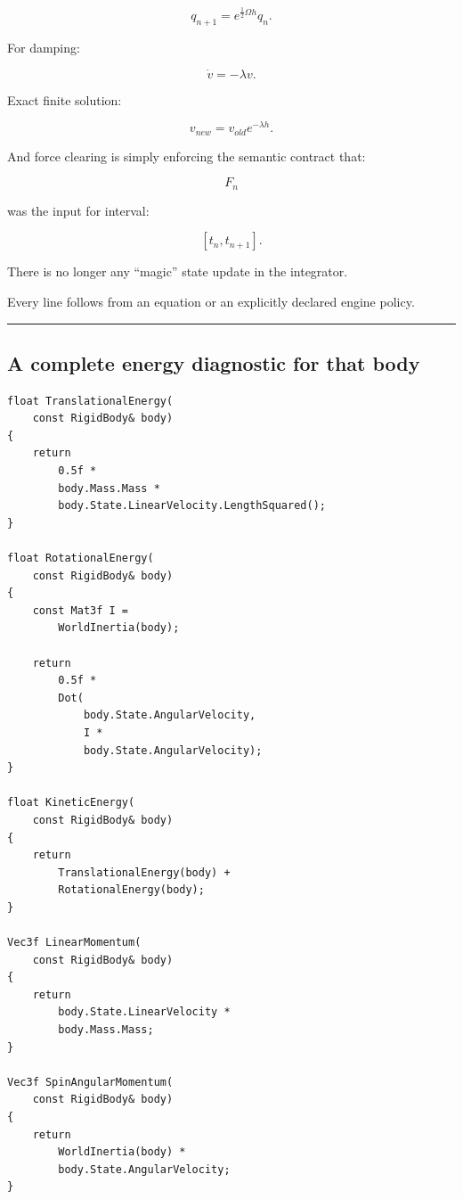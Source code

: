 \[
\boxed{
q_{n+1}
=
e^{\frac12\Omega h}
q_n.
}
\]

For damping:

\[
\dot v=-\lambda v.
\]

Exact finite solution:

\[
\boxed{
v_{new}
=
v_{old}e^{-\lambda h}.
}
\]

And force clearing is simply enforcing the semantic contract that:

\[
F_n
\]

was the input for interval:

\[
[t_n,t_{n+1}].
\]

There is no longer any ``magic'' state update in the integrator.

Every line follows from an equation or an explicitly declared engine policy.

\begin{center}\rule{0.5\linewidth}{0.5pt}\end{center}

\subsection{A complete energy diagnostic for that body}\label{06-engine-ii-ch039-a-complete-energy-diagnostic-for-that-body}

\hypertarget{06-engine-ii-ch039-a-complete-energy-diagnostic-for-that-body}{}

\begin{verbatim}
float TranslationalEnergy(
    const RigidBody& body)
{
    return
        0.5f *
        body.Mass.Mass *
        body.State.LinearVelocity.LengthSquared();
}

float RotationalEnergy(
    const RigidBody& body)
{
    const Mat3f I =
        WorldInertia(body);

    return
        0.5f *
        Dot(
            body.State.AngularVelocity,
            I *
            body.State.AngularVelocity);
}

float KineticEnergy(
    const RigidBody& body)
{
    return
        TranslationalEnergy(body) +
        RotationalEnergy(body);
}

Vec3f LinearMomentum(
    const RigidBody& body)
{
    return
        body.State.LinearVelocity *
        body.Mass.Mass;
}

Vec3f SpinAngularMomentum(
    const RigidBody& body)
{
    return
        WorldInertia(body) *
        body.State.AngularVelocity;
}
\end{verbatim}

